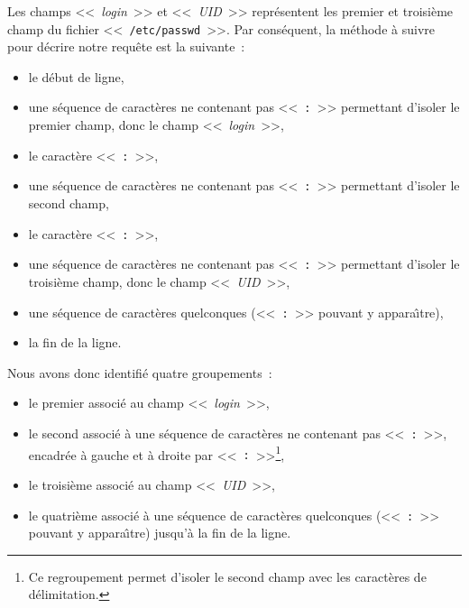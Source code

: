 Les champs <<~{\sl login}~>> et <<~{\sl UID}~>> repr{\'e}sentent les premier et
troisi{\`e}me champ du fichier <<~{\tt /etc/passwd}~>>. Par cons{\'e}quent, la m{\'e}thode {\`a} suivre pour d{\'e}crire notre requ{\^e}te est la suivante~:
\begin{itemize}
	\item	le d{\'e}but de ligne,\\[2ex]
	\item	une s{\'e}quence de caract{\`e}res ne contenant pas <<~{\tt :}~>> permettant
			d'isoler le premier champ, donc le champ <<~{\sl login}~>>,\\[2ex]
	\item	le caract{\`e}re <<~{\tt :}~>>,\\[2ex]
	\item	une s{\'e}quence de caract{\`e}res ne contenant pas <<~{\tt :}~>> permettant
			d'isoler le second champ,\\[2ex]
	\item	le caract{\`e}re <<~{\tt :}~>>,\\[2ex]
	\item	une s{\'e}quence de caract{\`e}res ne contenant pas <<~{\tt :}~>> permettant
			d'isoler le troisi{\`e}me  champ, donc le champ <<~{\sl UID}~>>,\\[2ex]
	\item	une s{\'e}quence de caract{\`e}res quelconques (<<~{\tt :}~>> pouvant y
			appara{\^\i}tre),\\[2ex]
	\item	la fin de la ligne.
\end{itemize}
Nous avons donc identifi{\'e} quatre groupements~:
\begin{itemize}
	\item	le premier associ{\'e} au champ <<~{\sl login}~>>,\\[2ex]
	\item	le second associ{\'e} {\`a} une s{\'e}quence de caract{\`e}res ne
			contenant pas <<~{\tt :}~>>, encadr{\'e}e {\`a} gauche et {\`a} droite par
			<<~{\tt :}~>>\footnote{Ce regroupement permet d'isoler le second
			champ avec les caract{\`e}res de d{\'e}limitation.},\\[2ex]
	\item	le troisi{\`e}me associ{\'e} au champ <<~{\sl UID}~>>,\\[2ex]
	\item	le quatri{\`e}me associ{\'e} {\`a} une s{\'e}quence de caract{\`e}res quelconques
			(<<~{\tt :}~>> pouvant y appara{\^\i}tre) jusqu'{\`a} la fin de la ligne.
\end{itemize}

